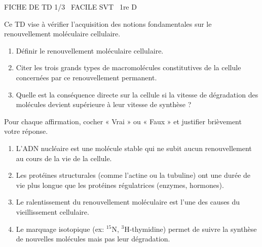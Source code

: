\documentclass[11pt]{article}
\begin{document}
\begin{tcolorbox}[enhanced,colback=popink,colframe=popink,arc=10pt,boxrule=0pt,left=12pt,right=12pt,top=9pt,bottom=9pt]
{\color{white}\popxbold\small FICHE DE TD 1/3 \textbullet\ FACILE \hfill SVT \textbullet\ 1re D\par}
\end{tcolorbox}
\vspace{4pt}
Ce TD vise à vérifier l'acquisition des notions fondamentales sur le renouvellement moléculaire cellulaire.

\begin{exercice}
\begin{enumerate}
    \item Définir le renouvellement moléculaire cellulaire.
    \item Citer les trois grands types de macromolécules constitutives de la cellule concernées par ce renouvellement permanent.
    \item Quelle est la conséquence directe sur la cellule si la vitesse de dégradation des molécules devient supérieure à leur vitesse de synthèse ?
\end{enumerate}
\end{exercice}

\begin{exercice}
Pour chaque affirmation, cocher « Vrai » ou « Faux » et justifier brièvement votre réponse.
\begin{enumerate}
    \item L'ADN nucléaire est une molécule stable qui ne subit aucun renouvellement au cours de la vie de la cellule.
    \item Les protéines structurales (comme l'actine ou la tubuline) ont une durée de vie plus longue que les protéines régulatrices (enzymes, hormones).
    \item Le ralentissement du renouvellement moléculaire est l'une des causes du vieillissement cellulaire.
    \item Le marquage isotopique (ex: $^{15}$N, $^{3}$H-thymidine) permet de suivre la synthèse de nouvelles molécules mais pas leur dégradation.
\end{enumerate}
\end{exercice}
\end{document}
